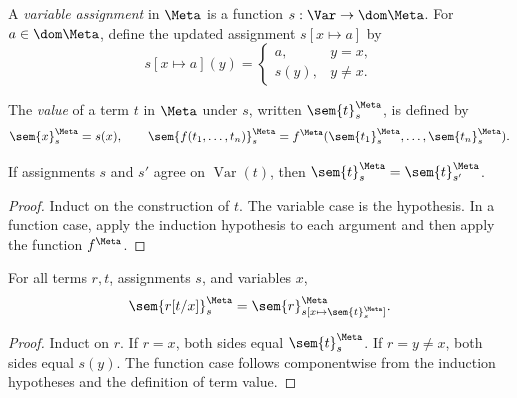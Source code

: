 \begin{definition}
A \emph{variable assignment} in \(\Meta\) is a function
\(s:\Var\to\dom\Meta\).  For \(a\in\dom\Meta\), define the updated
assignment \(s[x\mapsto a]\) by
\[
 s[x\mapsto a](y)=
 \begin{cases}
   a,&y=x,\\
   s(y),&y\ne x.
 \end{cases}
\]
\end{definition}

\begin{definition}
The \emph{value} of a term \(t\) in \(\Meta\) under \(s\), written
\(\sem{t}^{\Meta}_s\), is defined by
\[
 \sem{x}^{\Meta}_s=s(x),
 \qquad
 \sem{f(t_1,\ldots,t_n)}^{\Meta}_s
 =f^{\Meta}(\sem{t_1}^{\Meta}_s,\ldots,\sem{t_n}^{\Meta}_s).
\]
\end{definition}

\begin{lemma}
If assignments \(s\) and \(s'\) agree on \(\operatorname{Var}(t)\), then
\(\sem{t}^{\Meta}_s=\sem{t}^{\Meta}_{s'}\).
\end{lemma}
\begin{proof}
Induct on the construction of \(t\).  The variable case is the hypothesis.
In a function case, apply the induction hypothesis to each argument and then
apply the function \(f^{\Meta}\).
\end{proof}

\begin{lemma}
\label{lem:term-substitution}
For all terms \(r,t\), assignments \(s\), and variables \(x\),
\[
 \sem{r[t/x]}^{\Meta}_s
 =\sem{r}^{\Meta}_{s[x\mapsto\sem{t}^{\Meta}_s]}.
\]
\end{lemma}
\begin{proof}
Induct on \(r\).  If \(r=x\), both sides equal
\(\sem{t}^{\Meta}_s\).  If \(r=y\ne x\), both sides equal \(s(y)\).  The
function case follows componentwise from the induction hypotheses and the
definition of term value.
\end{proof}

